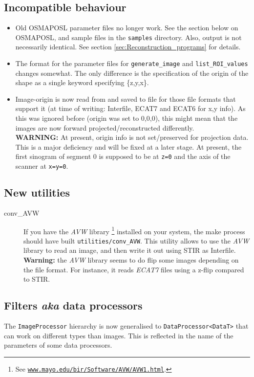 \documentclass{article}
\def\R2Lurl#1#2{\mbox{\href{#1}{\tt #2}}}
\begin{document}
\subsection{Incompatible behaviour}
\begin{itemize}
\item Old OSMAPOSL parameter files no longer work. See the section below on OSMAPOSL,
   and sample files in the \texttt{samples} directory. Also, output is not necessarily
   identical. See section \ref{sec:Reconstruction_programs} for details.
\item The format for the parameter files for \texttt{generate\_image} and
   \texttt{list\_ROI\_values} changes somewhat. The only difference is the
   specification of the origin of the shape as a single keyword specifying \{z,y,x\}.
\item Image-origin is now read from and saved to file for those file formats that
    support it (at time of writing: Interfile, ECAT7 and ECAT6 for x,y info).
    As this was ignored before (origin was set to 0,0,0), this might mean that 
    the images are now forward projected/reconstructed differently.\\
    \textbf{WARNING:} At present, origin info is not set/preserved for
    projection data. This is a major deficiency and will be fixed at a later stage.
   At present, the first sinogram of segment 0 is supposed to be at \texttt{z=0} and
   the axis of the scanner at \texttt{x=y=0}.
\end{itemize}

\subsection{New utilities}
\begin{description}
\item[conv\_AVW]
If you have the \textit{AVW}\texttrademark{} library
\footnote{See \R2Lurl{http://www.mayo.edu/bir/Software/AVW/AVW1.html}{www.mayo.edu/bir/Software/AVW/AVW1.html}.
} installed on your system, the make process should have built \texttt{utilities/conv\_AVW}.
This utility allows to use the \textit{AVW} library to read an image, and then write it out
using STIR as Interfile.\\
\textbf{Warning:} the \textit{AVW} library seems to do flip some images depending
on the file format. For instance, it reads \textit{ECAT7} files using a z-flip compared
to STIR.
\end{description}

\subsection{Filters \textit{aka} data processors}
The \texttt{ImageProcessor} hierarchy is now generalised to 
\texttt{DataProcessor<DataT>} that can work on different types than images. This is reflected
in the name of the parameters of some data processors.
\end{document}
